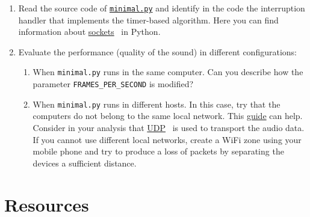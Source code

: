 \begin{enumerate}

\item Read the source code of
  \href{https://github.com/Tecnologias-multimedia/intercom/blob/master/src/minimal.py}{\texttt{minimal.py}}
  and identify in the code the interruption handler that implements
  the timer-based algorithm. Here you can find information about
  \href{https://github.com/vicente-gonzalez-ruiz/YAPT/blob/master/03-IO/networking/sockets.ipynb}{sockets}~\cite{YAPT} in Python.
  
\item Evaluate the performance (quality of the sound) in different configurations:
  \begin{enumerate}
  \item When \verb|minimal.py| runs in the same computer. Can you
    describe how the parameter \verb|FRAMES_PER_SECOND| is modified?
  \item When \verb|minimal.py| runs in different hosts. In this case,
    try that the computers do not belong to the same local
    network. This
    \href{https://www.noip.com/support/knowledgebase/general-port-forwarding-guide/}{guide}
    can help. Consider in your analysis that
    \href{https://en.wikipedia.org/wiki/User_Datagram_Protocol}{UDP}~\cite{UDP}
    is used to transport the audio data. If you cannot use different
    local networks, create a WiFi zone using your mobile phone and try
    to produce a loss of packets by separating the devices a
    sufficient distance.
  \end{enumerate}
\end{enumerate}

\section{Resources}


